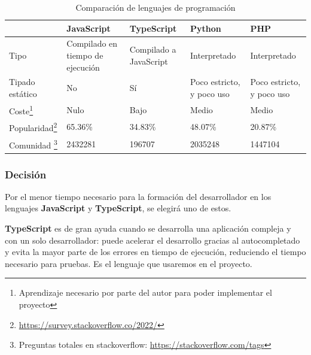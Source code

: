 \begin{table}
\begin{minipage}{\textwidth}
\begin{tabularx}{\textwidth}{|l|X|X|X|X|}
\hline
   & JavaScript                       & TypeScript             & Python                    & PHP                       \\
\hline
Tipo                                                & Compilado en tiempo de ejecución & Compilado a JavaScript & Interpretado              & Interpretado              \\
\hline
Tipado estático                                     & No                               & Sí                     & Poco estricto, y poco uso & Poco estricto, y poco uso \\
\hline
Coste\footnote{Aprendizaje necesario por parte del autor para poder implementar el proyecto}                                & Nulo                             & Bajo                   & Medio                     & Medio                     \\
\hline
Popularidad\footnote{\url{https://survey.stackoverflow.co/2022/}} & 65.36\%                          & 34.83\%                & 48.07\%                   & 20.87\%                   \\
\hline
Comunidad \footnote{Preguntas totales en stackoverflow: \url{https://stackoverflow.com/tags}}      & 2432281                          & 196707                 & 2035248                   & 1447104               \\
\hline
\end{tabularx}
\end{minipage}
\caption{Comparación de lenguajes de programación}\label{tab:comparacionLenguajes}
\end{table}

\subsubsection{Decisión}

Por el menor tiempo necesario para la formación del desarrollador en los lenguajes \textbf{JavaScript} y \textbf{TypeScript}, se elegirá uno de estos.

\textbf{TypeScript} es de gran ayuda cuando se desarrolla una aplicación compleja y con un solo desarrollador: puede acelerar el desarrollo gracias al autocompletado y evita la mayor parte de los errores en tiempo de ejecución, reduciendo el tiempo necesario para pruebas. Es el lenguaje que usaremos en el proyecto.

